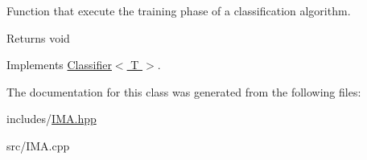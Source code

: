 Function that execute the training phase of a classification algorithm. 

\begin{DoxyReturn}{Returns}
void 
\end{DoxyReturn}


Implements \hyperlink{class_classifier_a120849bfdfa3ba7a0388b32b2d76bf4f}{Classifier$<$ T $>$}.



The documentation for this class was generated from the following files\+:\begin{DoxyCompactItemize}
\item 
includes/\hyperlink{_i_m_a_8hpp}{I\+M\+A.\+hpp}\item 
src/I\+M\+A.\+cpp\end{DoxyCompactItemize}
